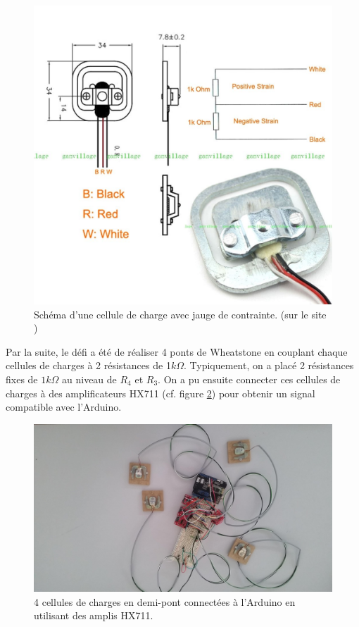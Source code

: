 \documentclass{polytech/polytech}
\begin{document}
\begin{figure}
\begin{center}
\includegraphics[width=12cm]{image/load_sensor.jpg}
\end{center}
\caption{Schéma d'une cellule de charge avec jauge de contrainte. (sur le site \cite{load_cell})}
\label{fig:load_sensor}
\end{figure}

Par la suite, le défi a été de réaliser 4 ponts de Wheatstone en couplant chaque cellules de charges à 2 résistances de 1$k\Omega$. Typiquement, on a placé 2 résistances fixes de $1k\Omega$ au niveau de $R_4$ et $R_3$.  On a pu ensuite connecter ces cellules de charges à des amplificateurs HX711 (cf. figure \ref{fig:load_sensor_connected}) pour obtenir un signal compatible avec l'Arduino.

\begin{figure}
\begin{center}
\includegraphics[width=12cm]{image/load_sensor_connected.jpg}
\end{center}
\caption{4 cellules de charges en demi-pont connectées à l'Arduino en utilisant des amplis HX711.}
\label{fig:load_sensor_connected}
\end{figure}
\end{document}
